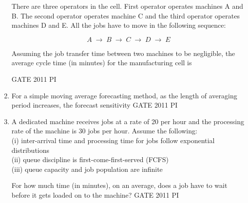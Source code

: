\documentclass[journal,12pt,onecolumn]{IEEEtran}
\theoremstyle{remark}
\begin{document}
\begin{enumerate}
There are three operators in the cell. First operator operates machines A and B. The second operator operates machine C and the third operator operates machines D and E. All the jobs have to move in the following sequence:  

\[
A \;\to\; B \;\to\; C \;\to\; D \;\to\; E
\]

Assuming the job transfer time between two machines to be negligible, the average cycle time (in minutes) for the manufacturing cell is  

\hfill GATE 2011 PI  

\begin{enumerate}
\end{enumerate}

\item
For a simple moving average forecasting method, as the length of averaging period increases, the forecast sensitivity
\hfill{GATE 2011 PI}
\begin{enumerate}
\end{enumerate}


\item
A dedicated machine receives jobs at a rate of 20 per hour and the processing rate of the machine is 30 jobs per hour. Assume the following: \\
(i) inter-arrival time and processing time for jobs follow exponential distributions \\
(ii) queue discipline is first-come-first-served (FCFS) \\
(iii) queue capacity and job population are infinite

For how much time (in minutes), on an average, does a job have to wait before it gets loaded on to the machine?
\hfill{GATE 2011 PI}
\begin{enumerate}
\end{enumerate}



\end{enumerate}
\end{document}
